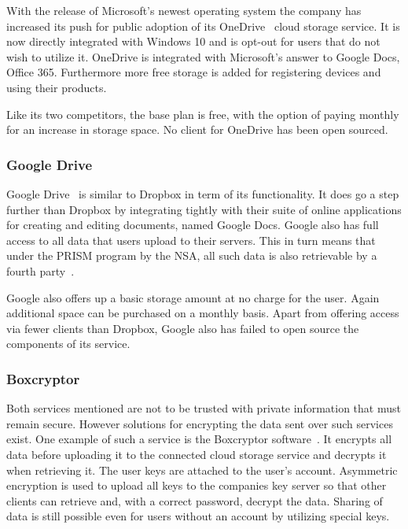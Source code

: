 With the release of Microsoft's newest operating system the company has increased its push for public adoption of its OneDrive~\cite{web:site:onedrive} cloud storage service.
It is now directly integrated with Windows 10 and is opt-out for users that do not wish to utilize it.
OneDrive is integrated with Microsoft's answer to Google Docs, Office 365.
Furthermore more free storage is added for registering devices and using their products.

Like its two competitors, the base plan is free, with the option of paying monthly for an increase in storage space.
No client for OneDrive has been open sourced.

\subsubsection{Google Drive}

Google Drive~\cite{web:site:gdrive} is similar to Dropbox in term of its functionality.
It does go a step further than Dropbox by integrating tightly with their suite of online applications for creating and editing documents, named Google Docs.
Google also has full access to all data that users upload to their servers.
This in turn means that under the PRISM program by the NSA, all such data is also retrievable by a fourth party~\cite{web:site:rt:google}.

Google also offers up a basic storage amount at no charge for the user.
Again additional space can be purchased on a monthly basis.
Apart from offering access via fewer clients than Dropbox, Google also has failed to open source the components of its service.

\subsubsection{Boxcryptor}

Both services mentioned are not to be trusted with private information that must remain secure.
However solutions for encrypting the data sent over such services exist.
One example of such a service is the Boxcryptor software~\cite{web:site:boxcryptor}.
It encrypts all data before uploading it to the connected cloud storage service and decrypts it when retrieving it.
The user keys are attached to the user's account.
Asymmetric encryption is used to upload all keys to the companies key server so that other clients can retrieve and, with a correct password, decrypt the data.
Sharing of data is still possible even for users without an account by utilizing special keys.

